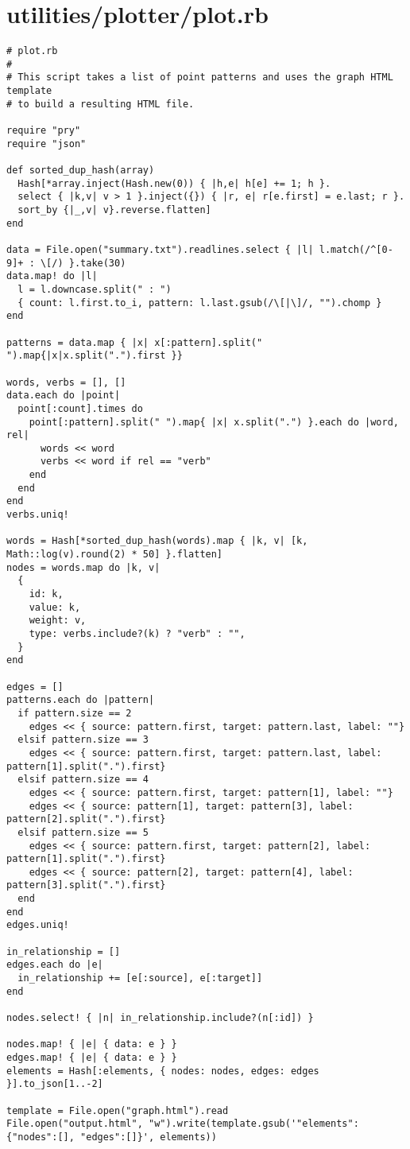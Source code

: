 \documentclass{article}
\begin{document}
\section*{utilities/plotter/plot.rb}
\begin{verbatim}
# plot.rb
#
# This script takes a list of point patterns and uses the graph HTML template
# to build a resulting HTML file.

require "pry"
require "json"

def sorted_dup_hash(array)
  Hash[*array.inject(Hash.new(0)) { |h,e| h[e] += 1; h }.
  select { |k,v| v > 1 }.inject({}) { |r, e| r[e.first] = e.last; r }.
  sort_by {|_,v| v}.reverse.flatten]
end

data = File.open("summary.txt").readlines.select { |l| l.match(/^[0-9]+ : \[/) }.take(30)
data.map! do |l|
  l = l.downcase.split(" : ")
  { count: l.first.to_i, pattern: l.last.gsub(/\[|\]/, "").chomp }
end

patterns = data.map { |x| x[:pattern].split(" ").map{|x|x.split(".").first }}

words, verbs = [], []
data.each do |point|
  point[:count].times do
    point[:pattern].split(" ").map{ |x| x.split(".") }.each do |word, rel|
      words << word
      verbs << word if rel == "verb"
    end
  end
end
verbs.uniq!

words = Hash[*sorted_dup_hash(words).map { |k, v| [k, Math::log(v).round(2) * 50] }.flatten]
nodes = words.map do |k, v|
  {
    id: k,
    value: k,
    weight: v,
    type: verbs.include?(k) ? "verb" : "",
  }
end

edges = []
patterns.each do |pattern|
  if pattern.size == 2
    edges << { source: pattern.first, target: pattern.last, label: ""}
  elsif pattern.size == 3
    edges << { source: pattern.first, target: pattern.last, label: pattern[1].split(".").first}
  elsif pattern.size == 4
    edges << { source: pattern.first, target: pattern[1], label: ""}
    edges << { source: pattern[1], target: pattern[3], label: pattern[2].split(".").first}
  elsif pattern.size == 5
    edges << { source: pattern.first, target: pattern[2], label: pattern[1].split(".").first}
    edges << { source: pattern[2], target: pattern[4], label: pattern[3].split(".").first}
  end
end
edges.uniq!

in_relationship = []
edges.each do |e|
  in_relationship += [e[:source], e[:target]]
end

nodes.select! { |n| in_relationship.include?(n[:id]) }

nodes.map! { |e| { data: e } }
edges.map! { |e| { data: e } }
elements = Hash[:elements, { nodes: nodes, edges: edges }].to_json[1..-2]

template = File.open("graph.html").read
File.open("output.html", "w").write(template.gsub('"elements":{"nodes":[], "edges":[]}', elements))


\end{verbatim}
\pagebreak
\end{document}
